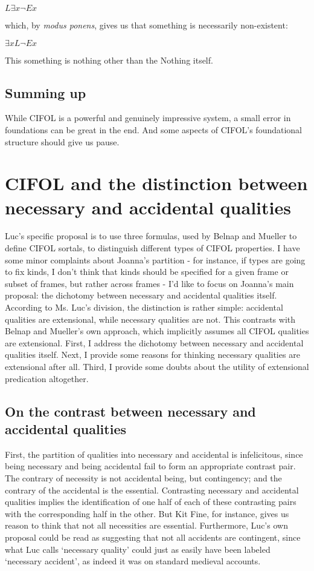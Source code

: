 \documentclass[]{article}
\begin{document}
$L \exists x \neg Ex$

which, by \textit{modus ponens}, gives us that something is necessarily non-existent:

$\exists x L \neg Ex$

This something is nothing other than the Nothing itself.

\subsection{Summing up}
While CIFOL is a powerful and genuinely impressive system, a small error in foundations can be great in the end. And some aspects of CIFOL's foundational structure should give us pause.

\section{CIFOL and the distinction between necessary and accidental qualities}
Luc's specific proposal is to use three formulas, used by Belnap and Mueller to define CIFOL sortals, to distinguish different types of CIFOL properties. I have some minor complaints about Joanna's partition - for instance, if types are going to fix kinds, I don't think that kinds should be specified for a given frame or subset of frames, but rather across frames - I'd like to focus on Joanna's main proposal: the dichotomy between necessary and accidental qualities itself. According to Ms. Luc's division, the distinction is rather simple: accidental qualities are extensional, while necessary qualities are not. This contrasts with Belnap and Mueller's own approach, which implicitly assumes all CIFOL qualities are extensional. First, I address the dichotomy between necessary and accidental qualities itself. Next, I provide some reasons for thinking necessary qualities are extensional after all. Third, I provide some doubts about the utility of extensional predication altogether.

\subsection{On the contrast between necessary and accidental qualities}
First, the partition of qualities into necessary and accidental is infelicitous, since being necessary and being accidental fail to form an appropriate contrast pair. The contrary of necessity is not accidental being, but contingency; and the contrary of the accidental is the essential. Contrasting necessary and accidental qualities implies the identification of one half of each of these contrasting pairs with the corresponding half in the other. But Kit Fine, for instance, gives us reason to think that not all necessities are essential. Furthermore, Luc's own proposal could be read as suggesting that not all accidents are contingent, since what Luc calls `necessary quality' could just as easily have been labeled `necessary accident', as indeed it was on standard medieval accounts.
\end{document}
